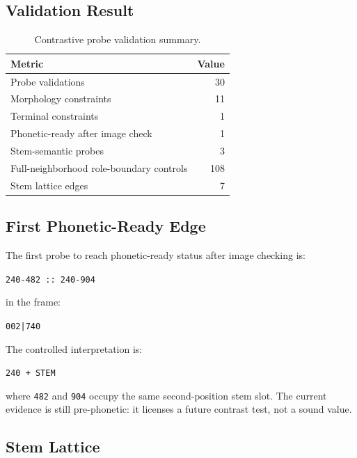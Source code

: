 \subsection{Validation Result}

\begin{table}[htbp]
\centering
\begin{tabular}{lr}
\toprule
\textbf{Metric} & \textbf{Value} \\
\midrule
Probe validations & 30 \\
Morphology constraints & 11 \\
Terminal constraints & 1 \\
Phonetic-ready after image check & 1 \\
Stem-semantic probes & 3 \\
Full-neighborhood role-boundary controls & 108 \\
Stem lattice edges & 7 \\
\bottomrule
\end{tabular}
\caption{Contrastive probe validation summary.}
\label{tab:contrastive-probe-validation-summary}
\end{table}

\subsection{First Phonetic-Ready Edge}

The first probe to reach phonetic-ready status after image checking is:

\begin{center}
\texttt{240-482 :: 240-904}
\end{center}

in the frame:

\begin{center}
\texttt{002|740}
\end{center}

The controlled interpretation is:

\begin{center}
\texttt{240 + STEM}
\end{center}

where \texttt{482} and \texttt{904} occupy the same second-position stem slot. The current evidence is still pre-phonetic: it licenses a future contrast test, not a sound value.

\subsection{Stem Lattice}

